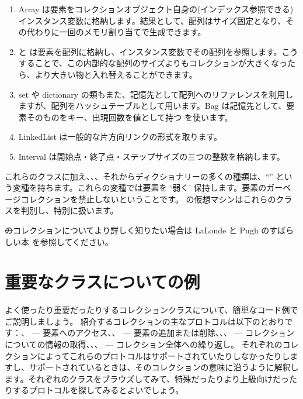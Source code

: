 \documentclass[a4paper,10pt,twoside]{book}
\begin{document}
\begin{enumerate}
  \item Array は要素をコレクションオブジェクト自身の(インデックス参照できる)インスタンス変数に格納します。結果として、配列はサイズ固定となり、その代わりに一回のメモリ割り当てで生成できます。
  \item {} と  は要素を配列に格納し、インスタンス変数でその配列を参照します。こうすることで、この内部的な配列のサイズよりもコレクションが大きくなったら、より大きい物と入れ替えることができます。
  \item set や dictionary の類もまた、記憶先として配列へのリファレンスを利用しますが、配列をハッシュテーブルとして用います。Bag は記憶先として、要素そのものをキー、出現回数を値として持つ  を使います。
  \item LinkedList は一般的な片方向リンクの形式を取ります。
  \item Interval は開始点・終了点・ステップサイズの三つの整数を格納します。
\end{enumerate}
これらのクラスに加え、、、それからディクショナリーの多くの種類は、``'' という変種を持ちます。これらの変種では要素を `弱く' 保持します。\ie 要素のガーベージコレクションを禁止しないということです。
\pharo の仮想マシンはこれらのクラスを判別し、特別に扱います。

\st のコレクションについてより詳しく知りたい場合は LaLonde と Pugh のすばらしい本\cite{LaLo90a} を参照してください。

\section{重要なクラスについての例}
よく使ったり重要だったりするコレクションクラスについて、簡単なコード例でご説明しましょう。
紹介するコレクションの主なプロトコルは以下のとおりです：、 --- 要素へのアクセス、、 --- 要素の追加または削除、、、 --- コレクションについての情報の取得、、、 --- コレクション全体への繰り返し。
それぞれのコレクションによってこれらのプロトコルはサポートされていたりしなかったりしますし、サポートされているときは、そのコレクションの意味に沿うように解釈します。それぞれのクラスをブラウズしてみて、特殊だったりより上級向けだったりするプロトコルを探してみるとよいでしょう。
\end{document}
